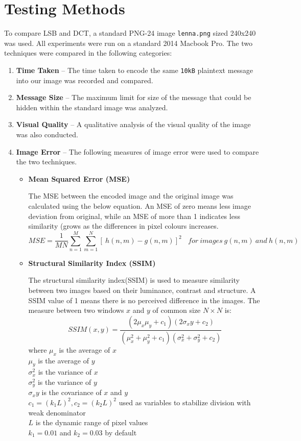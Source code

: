 \documentclass[11pt,letterpaper]{article}
\begin{document}
\section{Testing Methods}
To compare LSB and DCT, a standard PNG-24 image \texttt{lenna.png} sized 240x240 was used. All experiments were run on a standard 2014 Macbook Pro. The two techniques were compared in the following categories:
\begin{enumerate}
\setlength\itemsep{0pt}
\item \textbf{Time Taken} -- The time taken to encode the same \texttt{10kB} plaintext message into our image was recorded and compared.

\item \textbf{Message Size} -- The maximum limit for size of the message that could be hidden within the standard image was analyzed.

\item \textbf{Visual Quality} -- A qualitative analysis of the visual quality of the image was also conducted. 

\item \textbf{Image Error} -- The following measures of image error were used to compare the two techniques.
\begin{itemize}
\setlength\itemsep{0pt}
\item \textbf{Mean Squared Error (MSE)}

The MSE between the encoded image and the original image was calculated using the below equation. An MSE of zero means less image deviation from original, while an MSE of more than 1 indicates less similarity (grows as the differences in pixel colours increases.
$$MSE = \frac{1}{MN}\sum_{n=1}^{M}\sum_{m=1}^{N} \left[\ h(n,m) - g(n,m) \right]^2 \ \ \ \ for\ images\ g(n,m)\ and\ h(n,m)$$

\item \textbf{Structural Similarity Index (SSIM)}

The structural similarity index(SSIM) is used to measure similarity between two images based on their luminance, contrast and structure. A SSIM value of 1 means there is no perceived difference in the images. The measure between two windows $x$ and $y$ of common size $N \times N$ is:
$$
SSIM(x,y) = \frac{(2\mu_x\mu_y + c_1)(2\sigma_xy + c_2)}{(\mu_x^2 + \mu_y^2 + c_1)(\sigma_x^2 + \sigma_y^2 + c_2)}
$$
where $\mu_x$ is the average of $x$\\
$\mu_y$ is the average of $y$\\
$\sigma_x^2$ is the variance of $x$\\
$\sigma_y^2$ is the variance of $y$\\
$\sigma_xy$ is the covariance of $x$ and $y$\\
$c_1=(k_1L)^2, c_2=(k_2L)^2$ used as variables to stabilize division with weak denominator\\
$L$ is the dynamic range of pixel values\\
$k_1=0.01$ and $k_2=0.03$ by default
\end{itemize}
\end{enumerate}
\end{document}
